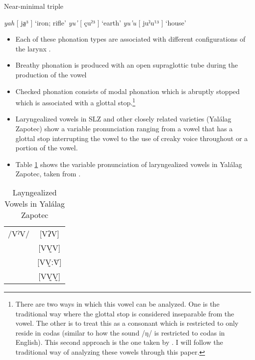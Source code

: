 \documentclass[12pt, letterpaper]{article}
\providecommand{\lsptoprule}{\midrule\toprule}
\providecommand{\lspbottomrule}{\bottomrule\midrule}
\begin{document}
\begin{exe}
	\ex \label{ex:triple} Near-minimal triple
	\begin{xlist} 
		\ex \textit{yah} [ ja̤³ ] `iron; rifle'
		\ex \textit{yu'} [ çuˀ³ ] `earth'
		\ex \textit{yu'u} [ juˀu¹³ ] `house' 
	\end{xlist} 
\end{exe} 

\begin{itemize}
	\item Each of these phonation types are associated with different configurations of the larynx \citep{eslingVoiceQualityLaryngeal2019}.
	\item Breathy phonation is produced with an open supraglottic tube during the production of the vowel
	\item Checked phonation consists of modal phonation which is abruptly stopped which is associated with a glottal stop.\footnote{There are two ways in which this vowel can be analyzed. One is the traditional way where the glottal stop is considered inseparable from the vowel. The other is to treat this as a consonant which is restricted to only reside in codas (similar to how the sound /ŋ/ is restricted to codas in English). This second approach is the one taken by \citet{avelinobecerraTopicsYalalagZapotec2004}. I will follow the traditional way of analyzing these vowels through this paper.}
	\item Laryngealized vowels in SLZ and other closely related varieties (Yalálag Zapotec) show a variable pronunciation ranging from a vowel that has a glottal stop interrupting the vowel to the use of creaky voice throughout or a portion of the vowel.  
	\item Table \ref{tab:laryngeal} shows the variable pronunciation of laryngealized vowels in Yalálag Zapotec, taken from \citet{avelinoAcousticElectroglottographicAnalyses2010}. 
	\end{itemize}

\begin{table}[!h]
\centering
\caption{Layngealized Vowels in Yalálag Zapotec}
\label{tab:laryngeal}
 \begin{tabular}{lc}
  \lsptoprule
	/VˀV/ &  [VʔV]  \\
	    	&  [VV̰V]   \\
	   		&  [VV̰ːV̆]  \\
	   		&  [VV̰V̰]	\\
  \lspbottomrule
 \end{tabular}
\end{table}
\end{document}
